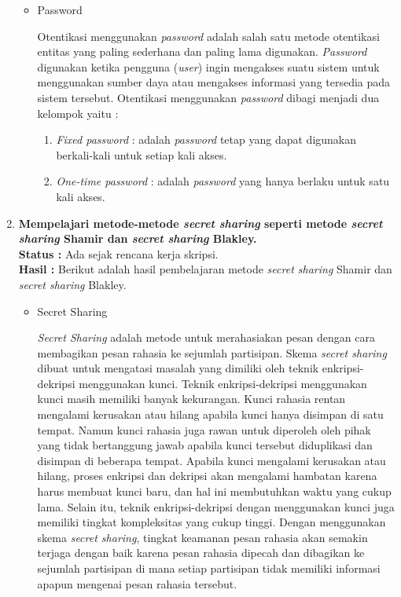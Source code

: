 \documentclass[a4paper,twoside]{article}
\begin{document}
\begin{enumerate}
\begin{itemize}
\item Password

Otentikasi menggunakan \textit{password} adalah salah satu metode otentikasi entitas yang paling sederhana dan paling lama digunakan. \textit{Password} digunakan ketika pengguna (\textit{user}) ingin mengakses suatu sistem untuk menggunakan sumber daya atau mengakses informasi yang tersedia pada sistem tersebut. Otentikasi menggunakan \textit{password} dibagi menjadi dua kelompok yaitu :
\begin{enumerate}
	\item \textit{Fixed password} : adalah \textit{password} tetap yang dapat digunakan berkali-kali untuk setiap kali akses.
	\item \textit{One-time password} : adalah \textit{password} yang hanya berlaku untuk satu kali akses. 
\end{enumerate}
\end{itemize}

\vspace{15pt}

		\item \textbf{Mempelajari metode-metode \textit{secret sharing} seperti metode \textit{secret sharing} Shamir dan \textit{secret sharing}
Blakley.}\\
		{\bf Status :} Ada sejak rencana kerja skripsi.\\
		{\bf Hasil :} Berikut adalah hasil pembelajaran metode \textit{secret sharing} Shamir dan \textit{secret sharing} Blakley.

\begin{itemize}
\item Secret Sharing

\textit{Secret Sharing} adalah metode untuk merahasiakan pesan dengan cara membagikan pesan rahasia ke sejumlah partisipan. Skema \textit{secret sharing} dibuat untuk mengatasi masalah yang dimiliki oleh teknik enkripsi-
dekripsi menggunakan kunci. Teknik enkripsi-dekripsi menggunakan kunci masih memiliki banyak kekurangan. Kunci rahasia rentan mengalami kerusakan atau hilang apabila kunci hanya disimpan di satu tempat. Namun kunci rahasia juga rawan untuk diperoleh oleh pihak yang tidak bertanggung jawab apabila kunci tersebut diduplikasi dan disimpan di beberapa tempat. Apabila kunci mengalami kerusakan atau hilang, proses enkripsi dan dekripsi akan mengalami hambatan karena harus membuat kunci baru, dan hal ini membutuhkan waktu yang cukup lama. Selain itu, teknik enkripsi-dekripsi dengan menggunakan kunci juga memiliki tingkat kompleksitas yang cukup tinggi. Dengan menggunakan skema \textit{secret sharing}, tingkat keamanan pesan rahasia akan semakin terjaga dengan baik karena pesan rahasia dipecah dan dibagikan ke sejumlah partisipan di mana setiap partisipan tidak memiliki informasi apapun mengenai pesan rahasia tersebut.


\end{itemize}
\end{enumerate}
\end{document}
